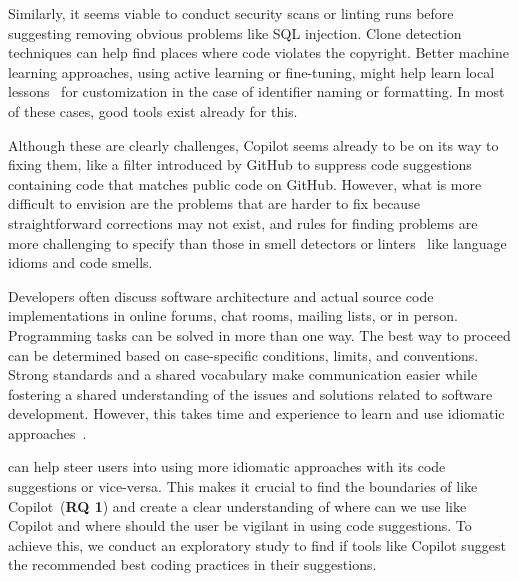 Similarly, it seems viable to conduct security scans or linting runs before suggesting removing obvious problems like SQL injection. 
Clone detection techniques can help find places where code violates the copyright. 
Better machine learning approaches, using active learning or fine-tuning, might help learn local lessons~\cite{Menzies2013} for customization in the case of identifier naming or formatting.
In most of these cases, good tools exist already for this. 

Although these are clearly challenges, Copilot seems already to be on its way to fixing them, like a filter introduced by GitHub to suppress code suggestions containing code that matches public code on GitHub. 
However, what is more difficult to envision are the problems that are harder to fix because straightforward corrections may not exist, and rules for finding problems are more challenging to specify than those in smell detectors or linters~\cite{Ernst2017} like language idioms and code smells.

Developers often discuss software architecture and actual source code implementations in online forums, chat rooms, mailing lists, or in person. 
Programming tasks can be solved in more than one way. 
The best way to proceed can be determined based on case-specific conditions, limits, and conventions. Strong standards and a shared vocabulary make communication easier while fostering a shared understanding of the issues and solutions related to software development.
However, this takes time and experience to learn and use idiomatic approaches~\cite{Alexandru2018}.

\cct{} can help steer users into using more idiomatic approaches with its code suggestions or vice-versa.
This makes it crucial to find the boundaries of \cct{} like Copilot~(\textbf{RQ 1}) and create a clear understanding of where can we use \cct{} like Copilot and where should the user be vigilant in using \cct{} code suggestions.
To achieve this, we conduct an exploratory study to find if \cct{} tools like Copilot suggest the recommended best coding practices in their suggestions.